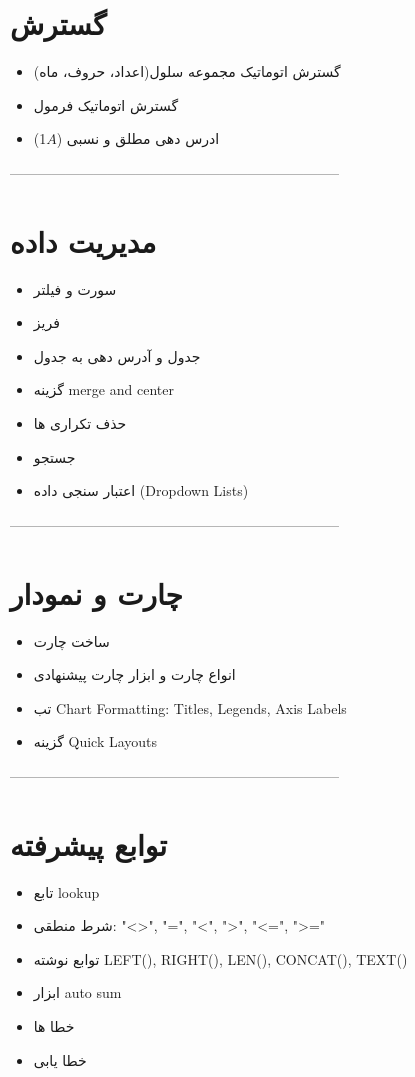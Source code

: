 \section{گسترش}
\begin{itemize}
\item
گسترش اتوماتیک مجموعه سلول(اعداد، حروف، ماه)
\item
گسترش اتوماتیک فرمول
\item
ادرس دهی مطلق و نسبی ($A$1)
\end{itemize}
-----------------------------------------------------------------------
\section{مدیریت داده}
\begin{itemize}
\item
سورت و فیلتر
\item
فریز
\item
جدول و آدرس دهی به جدول
\item
گزینه merge and center
\item
حذف تکراری ها
\item
جستجو
\item
اعتبار سنجی داده (Dropdown Lists)
\end{itemize}
-----------------------------------------------------------------------
\section{چارت و نمودار}
\begin{itemize}
\item
ساخت چارت
\item
انواع چارت و ابزار چارت پیشنهادی
\item
تب Chart Formatting:
Titles, Legends, Axis Labels
\item
گزینه Quick Layouts
\end{itemize}
-----------------------------------------------------------------------
\section{توابع پیشرفته}
\begin{itemize}
\item
تابع lookup
\item
شرط منطقی: "<>", "=", "<", ">", "<=", ">="
\item
توابع نوشته LEFT(), RIGHT(), LEN(), CONCAT(), TEXT()

\item
ابزار auto sum
\item
خطا ها
\item
خطا یابی
\end{itemize}

